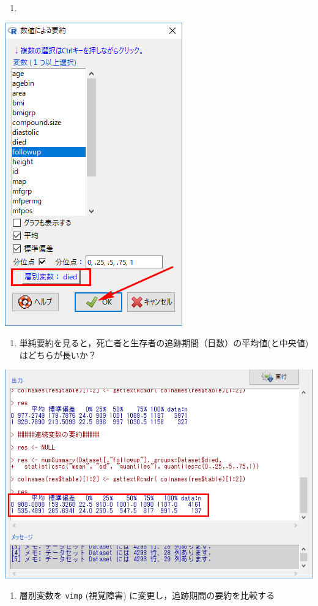 \documentclass[11pt,]{problemset}
\providecommand{\tightlist}{%
  \setlength{\itemsep}{0pt}\setlength{\parskip}{0pt}}
\begin{document}
\begin{enumerate}
\def\labelenumi{\arabic{enumi}.}
\setcounter{enumi}{5}
\item
\end{enumerate}

\begin{center}\includegraphics[width=0.45\linewidth,height=0.35\textheight]{pic/survival05} \end{center}

\begin{enumerate}
\def\labelenumi{\arabic{enumi}.}
\setcounter{enumi}{6}
\tightlist
\item
  単純要約を見ると，死亡者と生存者の追跡期間（日数）の平均値(と中央値)はどちらが長いか？
\end{enumerate}

\begin{center}\includegraphics[width=0.55\linewidth,height=0.35\textheight]{pic/survival06} \end{center}

\newpage

\begin{enumerate}
\def\labelenumi{\arabic{enumi}.}
\setcounter{enumi}{7}
\tightlist
\item
  層別変数を \texttt{vimp} (視覚障害) に変更し，追跡期間の要約を比較する
\end{enumerate}
\end{document}

